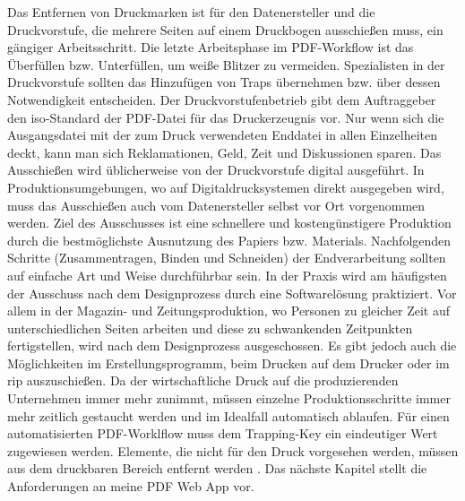 Das Entfernen von Druckmarken ist für den Datenersteller und die Druckvorstufe, die mehrere Seiten auf einem Druckbogen ausschießen muss, ein gängiger Arbeitsschritt. Die letzte Arbeitsphase im PDF-Workflow ist das Überfüllen bzw. Unterfüllen, um weiße Blitzer zu vermeiden. Spezialisten in der Druckvorstufe sollten das Hinzufügen von Traps übernehmen bzw. über dessen Notwendigkeit entscheiden. Der Druckvorstufenbetrieb gibt dem Auftraggeber den \gls{iso}-Standard der PDF-Datei für das Druckerzeugnis vor. Nur wenn sich die Ausgangsdatei mit der zum Druck verwendeten Enddatei in allen Einzelheiten deckt, kann man sich Reklamationen, Geld, Zeit und Diskussionen sparen. Das Ausschießen wird üblicherweise von der Druckvorstufe digital ausgeführt. In Produktionsumgebungen, wo auf Digitaldrucksystemen direkt ausgegeben wird, muss das Ausschießen auch vom Datenersteller selbst vor Ort vorgenommen werden. Ziel des Ausschusses ist eine schnellere und kostengünstigere Produktion durch die bestmöglichste Ausnutzung des Papiers bzw. Materials. Nachfolgenden Schritte (Zusammentragen, Binden und Schneiden) der Endverarbeitung sollten auf einfache Art und Weise durchführbar sein. In der Praxis wird am häufigsten der Ausschuss nach dem Designprozess durch eine Softwarelösung praktiziert. Vor allem in der Magazin- und Zeitungsproduktion, wo Personen zu gleicher Zeit auf unterschiedlichen Seiten arbeiten und diese zu schwankenden Zeitpunkten fertigstellen, wird nach dem Designprozess ausgeschossen. Es gibt jedoch auch die Möglichkeiten im Erstellungsprogramm, beim Drucken auf dem Drucker oder im \gls{rip} auszuschießen. Da der wirtschaftliche Druck auf die produzierenden Unternehmen immer mehr zunimmt, müssen einzelne Produktionsschritte immer mehr zeitlich gestaucht werden und im Idealfall automatisch ablaufen. Für einen automatisierten PDF-Worklflow muss dem Trapping-Key ein eindeutiger Wert zugewiesen werden. Elemente, die nicht für den Druck vorgesehen werden, müssen aus dem druckbaren Bereich entfernt werden \cite{schneeberger}. Das nächste Kapitel stellt die Anforderungen an meine PDF Web App vor.